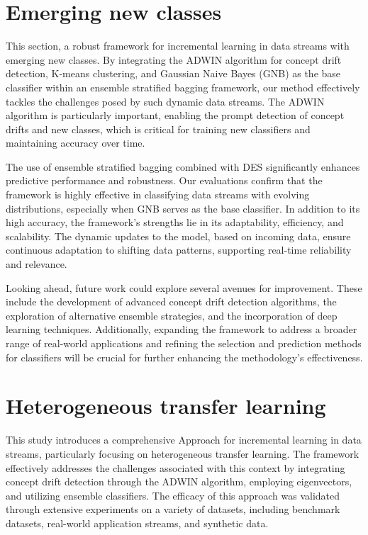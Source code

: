 \section{Emerging new classes}
\label{section:7_2}

This section, a robust framework for incremental learning in data streams with emerging new classes. By integrating the ADWIN algorithm for concept drift detection, K-means clustering, and Gaussian Naive Bayes (GNB) as the base classifier within an ensemble stratified bagging framework, our method effectively tackles the challenges posed by such dynamic data streams. The ADWIN algorithm is particularly important, enabling the prompt detection of concept drifts and new classes, which is critical for training new classifiers and maintaining accuracy over time.

The use of ensemble stratified bagging combined with DES significantly enhances predictive performance and robustness. Our evaluations confirm that the framework is highly effective in classifying data streams with evolving distributions, especially when GNB serves as the base classifier. In addition to its high accuracy, the framework's strengths lie in its adaptability, efficiency, and scalability. The dynamic updates to the model, based on incoming data, ensure continuous adaptation to shifting data patterns, supporting real-time reliability and relevance.

Looking ahead, future work could explore several avenues for improvement. These include the development of advanced concept drift detection algorithms, the exploration of alternative ensemble strategies, and the incorporation of deep learning techniques. Additionally, expanding the framework to address a broader range of real-world applications and refining the selection and prediction methods for classifiers will be crucial for further enhancing the methodology's effectiveness.

\section{Heterogeneous transfer learning}
\label{section:7_3}

This study introduces a comprehensive Approach for incremental learning in data streams, particularly focusing on heterogeneous transfer learning. The framework effectively addresses the challenges associated with this context by integrating concept drift detection through the ADWIN algorithm, employing eigenvectors, and utilizing ensemble classifiers. The efficacy of this approach was validated through extensive experiments on a variety of datasets, including benchmark datasets, real-world application streams, and synthetic data.

